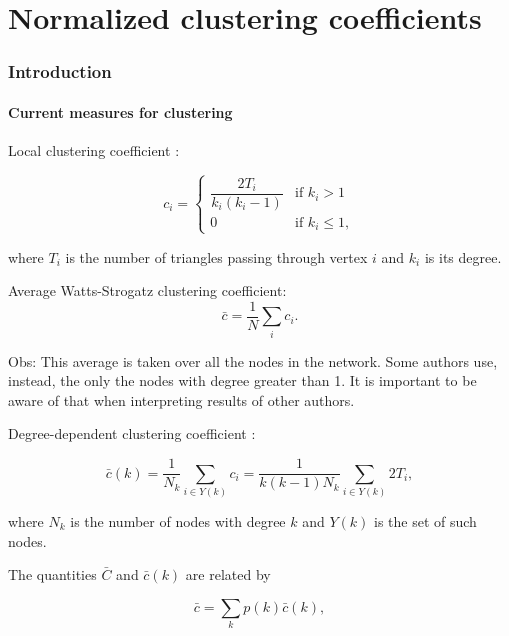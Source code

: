 \documentclass{article}
\begin{document}
\part{Normalized clustering coefficients}


\section{Introduction}

\subsection{Current measures for clustering}

Local clustering coefficient \cite{Watts1998}:

\begin{equation}
    c_i = 
    \left\{
    	\begin{array}{ll}
    		\dfrac{2 T_i}{k_i (k_i-1)}  & \mbox{if } k_i > 1 \\
    		0 & \mbox{if } k_i \leq 1,
    	\end{array}
    \right.
\end{equation}

where $T_i$ is the number of triangles passing through vertex $i$ and $k_i$ is its degree.

Average Watts-Strogatz clustering coefficient:
\begin{equation}
    \bar{c} = \dfrac{1}{N} \sum_i c_i.
\end{equation}

Obs: This average is taken over all the nodes in the network. Some authors use, instead, the only the nodes with degree greater than 1. It is important to be aware of that when interpreting results of other authors.

Degree-dependent clustering coefficient \cite{Vazquez2002Large-scaleInternet}:

\begin{equation}
    \bar{c}(k) = \dfrac{1}{N_k} \sum_{i\in Y(k)} c_i = \dfrac{1}{k(k-1)N_k} \sum_{i\in Y(k)} 2T_i,
\end{equation}

where $N_k$ is the number of nodes with degree $k$ and $Y(k)$ is the set of such nodes.

The quantities $\bar{C}$ and $\bar{c}(k)$ are related by

\begin{equation}
    \bar{c} = \sum_k p(k) \bar{c}(k),
\end{equation}
\end{document}
